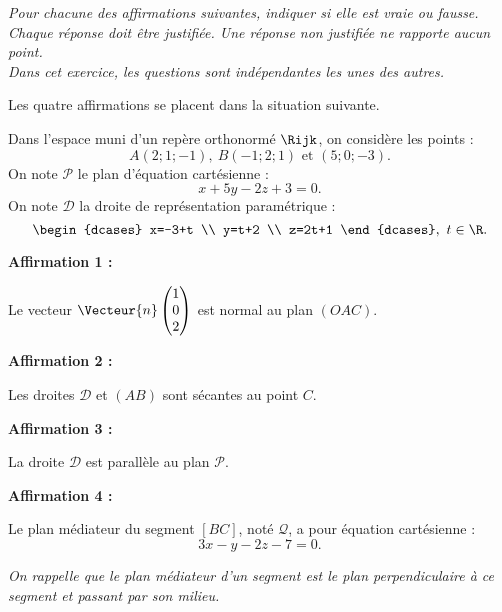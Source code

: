 \textit{Pour chacune des affirmations suivantes, indiquer si elle est vraie ou fausse.\\
Chaque réponse doit être justifiée. Une réponse non justifiée ne rapporte aucun point.\\
Dans cet exercice, les questions sont indépendantes les unes des autres.}

\medskip

Les quatre affirmations se placent dans la situation suivante.

\smallskip

Dans l’espace muni d’un repère orthonormé $\Rijk$, on considère les points : \[ A(2;1;-1),~B(-1;2;1) \text{ et } (5;0;-3). \]
%
On note $\mathcal{P}$ le plan d’équation cartésienne : \[ x +5y-2z +3 = 0. \]
%
On note $\mathcal{D}$ la droite de représentation paramétrique : \[ \begin{dcases} x=-3+t \\ y=t+2 \\ z=2t+1 \end{dcases},~t \in \R. \]

\smallskip

\textbf{Affirmation 1 :}

Le vecteur $\Vecteur{n}\begin{pmatrix}1\\0\\2\end{pmatrix}$ est normal au plan $(OAC)$.

\smallskip

\textbf{Affirmation 2 :}

Les droites $\mathcal{D}$ et $(AB)$ sont sécantes au point $C$.

\smallskip

\textbf{Affirmation 3 :}

La droite $\mathcal{D}$ est parallèle au plan $\mathcal{P}$.

\smallskip

\textbf{Affirmation 4 :}

Le plan médiateur du segment $[BC]$, noté $\mathcal{Q}$, a pour équation cartésienne : \[ 3x - y -2z -7 = 0. \]

\textit{On rappelle que le plan médiateur d’un segment est le plan perpendiculaire à ce segment et passant par son milieu.}